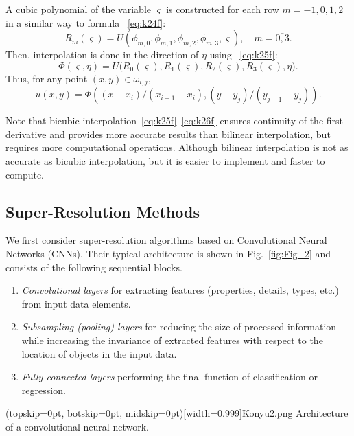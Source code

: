 \documentclass{ieeeaccess}
\begin{document}
A cubic polynomial of the variable $\varsigma$ is constructed for each row $m = -1, 0, 1, 2$ in a similar way to formula ~\eqref{eq:k24f}:
%
\begin{equation}\label{eq:k25f}
R_m(\varsigma) = U(\phi_{m,0}, \phi_{m,1}, \phi_{m,2}, \phi_{m,3}, \varsigma), \quad m = \overline{0,3}.
\end{equation}
%
Then, interpolation is done in the direction of $\eta$ using ~\eqref{eq:k25f}:
%
\begin{equation}\label{eq:k26f}
\Phi (\varsigma ,\eta ) = U\big( R_0(\varsigma ), R_1(\varsigma ), R_2(\varsigma ), R_3(\varsigma ), \eta \big).
\end{equation}
%
Thus, for any point $(x, y) \in \omega_{i,j}$,
$$
u(x,y)=\Phi ((x-x_i)/(x_{i+1}-x_i),
(y-y_j)/(y_{j+1}-y_j)).
$$

Note that bicubic interpolation~\eqref{eq:k25f}–\eqref{eq:k26f} ensures continuity of the first derivative and  provides more accurate results than bilinear interpolation, but requires more computational operations. Although bilinear interpolation is  not as accurate as bicubic interpolation, but it is easier to implement and faster to compute.


\subsection{Super-Resolution Methods}

We first consider super-resolution algorithms based on Convolutional Neural Networks (CNNs). Their  typical architecture is shown in Fig.~\ref{fig:Fig_2} and consists of the following sequential blocks.

\begin{enumerate}
 \item \textit{ Convolutional layers} for extracting features (properties, details, types, etc.) from input data elements.
 \item \textit {Subsampling (pooling) layers} for reducing the size of processed information while increasing the invariance of extracted features with respect to the location of objects in the input data.
\item \textit{Fully connected layers} performing the final function of classification or regression.
\end{enumerate}
\Figure[ht!](topskip=0pt, botskip=0pt, midskip=0pt)[width=0.999\linewidth]{Konyu2.png}
{Architecture of a convolutional neural network.
\label{fig:Fig_2}}
\end{document}
